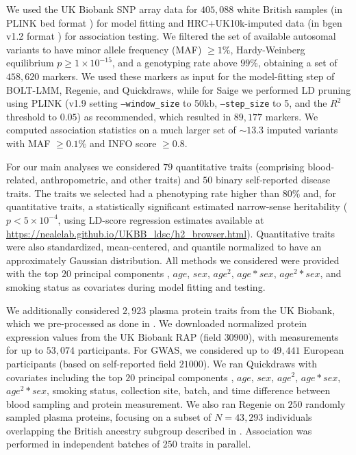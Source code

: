 We used the UK Biobank SNP array data for $405{,}088$ white British samples \cite{bycroft2018uk} (in PLINK bed format \cite{purcell2007plink,chang2015second}) for model fitting and HRC+UK10k-imputed data \cite{haplotype2016reference,uk10k2015uk10k,bycroft2018uk} (in bgen v1.2 format \cite{band2018bgen}) for association testing.
%
We filtered the set of available autosomal variants to have minor allele frequency (MAF) $\geq 1\%$, Hardy-Weinberg equilibrium $p \geq 1 \times 10^{-15}$, and a genotyping rate above $99\%$, obtaining a set of $458{,}620$ markers.
%
We used these markers as input for the model-fitting step of BOLT-LMM, Regenie, and Quickdraws, while for Saige we performed LD pruning using PLINK (v1.9 \cite{purcell2007plink,chang2015second} setting \texttt{--window\_size} to 50kb, \texttt{--step\_size} to 5, and the $R^2$ threshold to $0.05$) as recommended, which resulted in $89,177$ markers.
%
We computed association statistics on a much larger set of ${\sim}13.3$ imputed variants with MAF $\geq 0.1\%$ and INFO score $\geq 0.8$.
%

%
For our main analyses we considered $79$ quantitative traits (comprising blood-related, anthropometric, and other traits) and $50$ binary self-reported disease traits.
%
The traits we selected had a phenotyping rate higher than $80\%$ and, for quantitative traits, a statistically significant estimated narrow-sense heritability ($p < 5 \times 10^{-4}$, using LD-score regression estimates available at \url{https://nealelab.github.io/UKBB_ldsc/h2_browser.html}).
%
Quantitative traits were also standardized, mean-centered, and quantile normalized to have an approximately Gaussian distribution.
%
All methods we considered were provided with the top $20$ principal components \cite{bycroft2018uk}, $age$, $sex$, $age^2$, $age*sex$, $age^2*sex$, and smoking status as covariates during model fitting and testing.
%

We additionally considered $2{,}923$ plasma protein traits from the UK Biobank, which we pre-processed as done in \cite{sun2023plasma, dhindsa2023rare}.
%
We downloaded normalized protein expression values from the UK Biobank RAP (field $30900$), with measurements for up to $53{,}074$ participants.
%
For GWAS, we considered up to $49{,}441$ European participants (based on self-reported field $21000$).
%
We ran Quickdraws with covariates including the top $20$ principal components \cite{bycroft2018uk}, $age$, $sex$, $age^2$, $age*sex$, $age^2*sex$, smoking status, collection site, batch, and time difference between blood sampling and protein measurement.
%
We also ran Regenie on $250$ randomly sampled plasma proteins, focusing on a subset of $N=43{,}293$ individuals overlapping the British ancestry subgroup described in \cite{bycroft2018uk}.
%
Association was performed in independent batches of $250$ traits in parallel.

